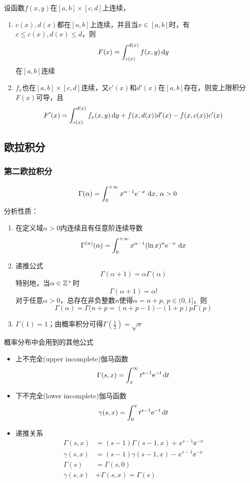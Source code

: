 \begin{theorem}
设函数$f(x,y)$在$[a,b]\times[c,d]$上连续，
\begin{enumerate}
	\item $c(x),d(x)$都在$[a,b]$上连续，并且当$x\in[a,b]$时，有$c\leq c(x),d(x)\leq d$，则
	\[F(x)=\int_{c(x)}^{d(x)}f(x,y)\,\mathrm{d} y\]
	在$[a,b]$连续
	\item $f_x$也在$[a,b]\times[c,d]$连续，又$c'(x)$和$d'(x)$在$[a,b]$存在，则变上限积分$F(x)$可导，且
	\[F'(x)=\int_{c(x)}^{d(x)}f_x(x,y)\,\mathrm{d} y+f(x,d(x))d'(x)-f(x,c(x))c'(x)\]
\end{enumerate}
\end{theorem}


\subsection{欧拉积分}
\subsubsection{第二欧拉积分}
\[\Gamma(\alpha)=\displaystyle\int_{0}^{+\infty}{x^{\alpha-1}\mathrm{e}^{-x}}\,\,\mathrm{d} x,\,\alpha>0\]
分析性质：
\begin{enumerate}
	\item 在定义域$\alpha>0$内连续且有任意阶连续导数
	\[\Gamma^{(n)}(\alpha)=\displaystyle\int_{0}^{+\infty}{x^{\alpha-1}(\ln x)^n\mathrm{e}^{-x}}\,\,\mathrm{d} x\]
	\item 递推公式
	\[\Gamma(\alpha+1)=\alpha\Gamma(\alpha)\]
	特别地，当$\alpha\in\mathbb{Z}^+$时
	\[\Gamma(\alpha+1)=\alpha!\]
	对于任意$\alpha>0$，总存在非负整数$n$使得$\alpha=n+p,\,p\in(0,1]$，则
	\[\Gamma(\alpha)=\Gamma(n+p=(n+p-1)\cdots(1+p)p\Gamma(p)\]
	\item $\Gamma(1)=1$；由概率积分可得$\Gamma(\frac{1}{2})=\sqrt{\pi}$
\end{enumerate}
概率分布中会用到的其他公式
\begin{itemize}
\item 上不完全(upper incomplete)伽马函数
\[ \Gamma(s,x) = \int_x^{\infty} t^{s-1}\mathrm{e}^{-t}\,\mathrm{d} t\]
\item 下不完全(lower incomplete)伽马函数
\[ \gamma(s,x) = \int_{0}^{x}t^{s-1}\mathrm{e}^{-t}\,\mathrm{d} t\]
\item 递推关系
\[\begin{aligned}
\Gamma(s,x)&=(s-1)\Gamma(s-1,x) + x^{s-1} \ee^{-x}\\
\gamma(s,x)&=(s-1)\gamma(s-1,x) - x^{s-1} \ee^{-x}\\
\Gamma(s) &= \Gamma(s,0)\\
\gamma (s,x)&+\Gamma (s,x)=\Gamma (s)
\end{aligned}\]
\end{itemize}

